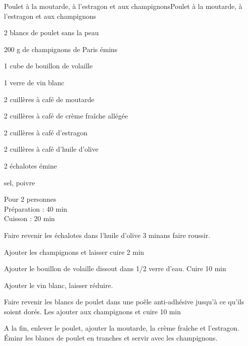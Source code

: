 \begin{recette}{Poulet à la moutarde, à l'estragon et aux champignons}{Poulet à la moutarde, à l'estragon et aux champignons}

\begin{ingredients}
2 blancs de poulet sans la peau\par
200 g de champignons de Paris émins\par
1 cube de bouillon de volaille\par
1 verre de vin blanc\par
2 cuillères à café de moutarde\par
2 cuillères à café de crème fraîche allégée\par
2 cuillères à café d'estragon\par
2 cuillères à café d'huile d'olive\par
2 échalotes émine\par
sel, poivre\par
\end{ingredients}

\begin{infos}
Pour 2 personnes\\
Préparation : 40 min\\
Cuisson : 20 min\\
\end{infos}

\begin{etapes}
\item Faire revenir les échalotes dans l'huile d'olive 3 minans faire roussir.
\item Ajouter les champignons et laisser cuire 2 min
\item Ajouter le bouillon de volaille dissout dans 1/2 verre d'eau. Cuire 10 min
\item Ajouter le vin blanc, laisser réduire.
\item Faire revenir les blancs de poulet dans une poêle anti-adhésive jusqu'à ce qu'ils soient dorés. Les ajouter aux champignons et cuire 10 min
\item A la fin, enlever le poulet, ajouter la moutarde, la crème fraîche et l'estragon. Éminr les blancs de poulet en tranches et servir avec les champignons.
\end{etapes}

\end{recette}